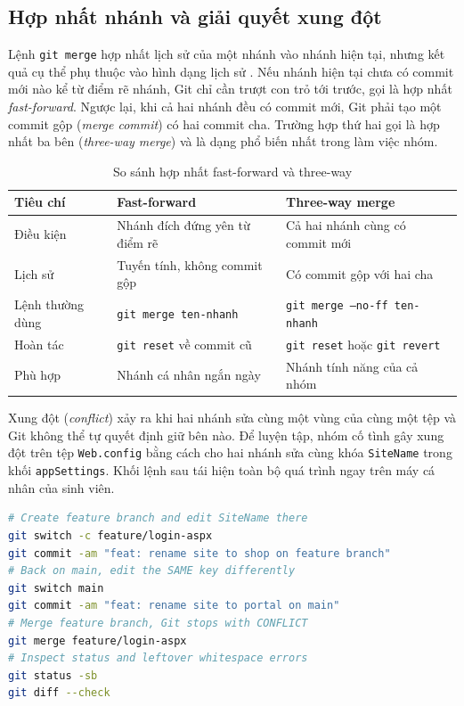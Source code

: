 \subsection{Hợp nhất nhánh và giải quyết xung đột}

Lệnh \verb|git merge| hợp nhất lịch sử của một nhánh vào nhánh hiện tại, nhưng kết quả cụ thể phụ thuộc vào hình dạng lịch sử \cite{progit}. Nếu nhánh hiện tại chưa có commit mới nào kể từ điểm rẽ nhánh, Git chỉ cần trượt con trỏ tới trước, gọi là hợp nhất \textit{fast-forward}. Ngược lại, khi cả hai nhánh đều có commit mới, Git phải tạo một commit gộp (\textit{merge commit}) có hai commit cha. Trường hợp thứ hai gọi là hợp nhất ba bên (\textit{three-way merge}) và là dạng phổ biến nhất trong làm việc nhóm.

\begin{table}[H]
\centering
\caption{So sánh hợp nhất fast-forward và three-way}
\label{tab:c23-merge-compare}
\begin{tabular}{lll}
\toprule
Tiêu chí & Fast-forward & Three-way merge \\
\midrule
Điều kiện & Nhánh đích đứng yên từ điểm rẽ & Cả hai nhánh cùng có commit mới \\
Lịch sử & Tuyến tính, không commit gộp & Có commit gộp với hai cha \\
Lệnh thường dùng & \texttt{git merge ten-nhanh} & \texttt{git merge --no-ff ten-nhanh} \\
Hoàn tác & \texttt{git reset} về commit cũ & \texttt{git reset} hoặc \texttt{git revert} \\
Phù hợp & Nhánh cá nhân ngắn ngày & Nhánh tính năng của cả nhóm \\
\bottomrule
\end{tabular}
\end{table}

Xung đột (\textit{conflict}) xảy ra khi hai nhánh sửa cùng một vùng của cùng một tệp và Git không thể tự quyết định giữ bên nào. Để luyện tập, nhóm cố tình gây xung đột trên tệp \verb|Web.config| bằng cách cho hai nhánh sửa cùng khóa \verb|SiteName| trong khối \verb|appSettings|. Khối lệnh sau tái hiện toàn bộ quá trình ngay trên máy cá nhân của sinh viên.

\begin{lstlisting}[language=bash, caption={Gây xung đột có chủ đích trên tệp cấu hình}, label={lst:c23-merge-conflict}]
# Create feature branch and edit SiteName there
git switch -c feature/login-aspx
git commit -am "feat: rename site to shop on feature branch"
# Back on main, edit the SAME key differently
git switch main
git commit -am "feat: rename site to portal on main"
# Merge feature branch, Git stops with CONFLICT
git merge feature/login-aspx
# Inspect status and leftover whitespace errors
git status -sb
git diff --check
\end{lstlisting}

